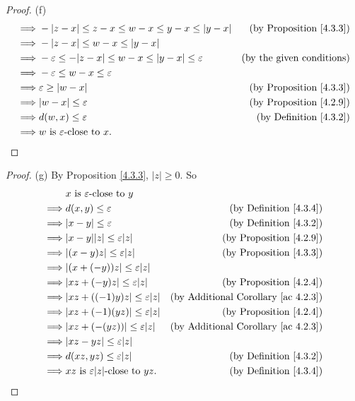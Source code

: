\begin{proof}{(f)}
\begin{align*}
\implies & -|z - x| \leq z - x \leq w - x \leq y - x \leq |y - x| & \text{(by Proposition \ref{4.3.3})} \\
\implies & -|z - x| \leq w - x \leq |y - x| \\
\implies & -\varepsilon \leq -|z - x| \leq w - x \leq |y - x| \leq \varepsilon & \text{(by the given conditions)} \\
\implies & -\varepsilon \leq w - x \leq \varepsilon \\
\implies & \varepsilon \geq |w - x| & \text{(by Proposition \ref{4.3.3})} \\
\implies & |w - x| \leq \varepsilon & \text{(by Proposition \ref{4.2.9})} \\
\implies & d(w, x) \leq \varepsilon & \text{(by Definition \ref{4.3.2})} \\
\implies & w \text{ is } \varepsilon\text{-close to } x.
\end{align*}
\end{proof}

\begin{proof}{(g)}
By Proposition \ref{4.3.3}, \(|z| \geq 0\).
So
\begin{align*}
& x \text{ is } \varepsilon\text{-close to } y \\
\implies & d(x, y) \leq \varepsilon & \text{(by Definition \ref{4.3.4})} \\
\implies & |x - y| \leq \varepsilon & \text{(by Definition \ref{4.3.2})} \\
\implies & |x - y||z| \leq \varepsilon|z| & \text{(by Proposition \ref{4.2.9})} \\
\implies & |(x - y)z| \leq \varepsilon|z| & \text{(by Proposition \ref{4.3.3})} \\
\implies & |(x + (-y))z| \leq \varepsilon|z| \\
\implies & |xz + (-y)z| \leq \varepsilon|z| & \text{(by Proposition \ref{4.2.4})} \\
\implies & |xz + ((-1)y)z| \leq \varepsilon|z| & \text{(by Additional Corollary \ref{ac 4.2.3})} \\
\implies & |xz + (-1)(yz)| \leq \varepsilon|z| & \text{(by Proposition \ref{4.2.4})} \\
\implies & |xz + (-(yz))| \leq \varepsilon|z| & \text{(by Additional Corollary \ref{ac 4.2.3})} \\
\implies & |xz - yz| \leq \varepsilon|z| \\
\implies & d(xz, yz) \leq \varepsilon|z| & \text{(by Definition \ref{4.3.2})} \\
\implies & xz \text{ is } \varepsilon|z|\text{-close to } yz. & \text{(by Definition \ref{4.3.4})} \\
\end{align*}
\end{proof}

